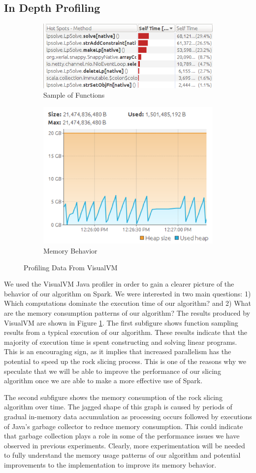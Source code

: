 \subsection{In Depth Profiling}
\begin{figure}[t]
\centering
\begin{subfigure}{0.5\textwidth}
    \centering
    \includegraphics[width=0.4\linewidth]{visualVMComputation.png}
    \caption{Sample of Functions}
\end{subfigure}%
\begin{subfigure}{0.5\textwidth}
    \centering
    \includegraphics[width=0.4\linewidth]{visualVMMemory.png}
    \caption{Memory Behavior}
\end{subfigure}
\caption{Profiling Data From VisualVM}
\label{fig:visualVM}
\end{figure}
We used the VisualVM Java profiler \cite{visualVM} in order to gain a clearer picture of the behavior of our algorithm on Spark. We were interested in two main questions: 1) Which computations dominate the execution time of our algorithm? and 2) What are the memory consumption patterns of our algorithm? The results produced by VisualVM are shown in Figure \ref{fig:visualVM}. The first subfigure shows function sampling results from a typical execution of our algorithm. These results indicate that the majority of execution time is spent constructing and solving linear programs. This is an encouraging sign, as it implies that increased parallelism has the potential to speed up the rock slicing process. This is one of the reasons why we speculate that we will be able to improve the performance of our slicing algorithm once we are able to make a more effective use of Spark.

The second subfigure shows the memory consumption of the rock slicing algorithm over time. The jagged shape of this graph is caused by periods of gradual in-memory data accumulation as processing occurs followed by executions of Java's garbage collector to reduce memory consumption. This could indicate that garbage collection plays a role in some of the performance issues we have observed in previous experiments. Clearly, more experimentation will be needed to fully understand the memory usage patterns of our algorithm and potential improvements to the implementation to improve its memory behavior.
